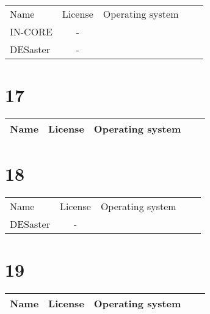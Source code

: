 \begin{table}[]
    \centering
    \begin{tabular}{l|cccc}
    \toprule
    Name &  License & Operating system\\
        IN-CORE & - &\\
        DESaster & - &\\

    \bottomrule
    \end{tabular}
    \end{table}

\section{17}

\begin{table}[]
    \centering
    \begin{tabular}{l|cccc}
    \toprule
    Name &  License & Operating system\\

    \bottomrule
    \end{tabular}
    \end{table}

\section{18}

\begin{table}[]
    \centering
    \begin{tabular}{l|cccc}
    \toprule
    Name &  License & Operating system\\
        DESaster & - &\\

    \bottomrule
    \end{tabular}
    \end{table}

\section{19}

\begin{table}[]
    \centering
    \begin{tabular}{l|cccc}
    \toprule
    Name &  License & Operating system\\

    \bottomrule
    \end{tabular}
    \end{table}

